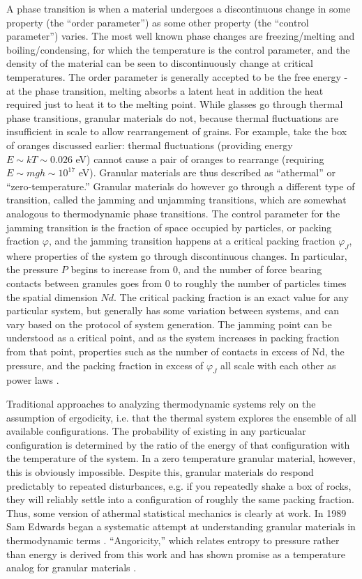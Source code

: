 A phase transition is when a material undergoes a discontinuous change in some property (the ``order parameter'') as some other property (the ``control parameter'') varies. The most well known phase changes are freezing/melting and boiling/condensing, for which the temperature is the control parameter, and the density of the material can be seen to discontinuously change at critical temperatures. The order parameter is generally accepted to be the free energy - at the phase transition, melting absorbs a latent heat in addition the heat required just to heat it to the melting point. While glasses go through thermal phase transitions, granular materials do not, because thermal fluctuations are insufficient in scale to allow rearrangement of grains. For example, take the box of oranges discussed earlier: thermal fluctuations (providing energy $E \sim kT \sim 0.026$ eV) cannot cause a pair of oranges to rearrange (requiring $E \sim mgh \sim 10^{17}$ eV). Granular materials are thus described as ``athermal'' or ``zero-temperature.''  Granular materials do however go through a different type of transition, called the jamming and unjamming transitions, which are somewhat analogous to thermodynamic phase transitions. The control parameter for the jamming transition is the fraction of space occupied by particles, or packing fraction $\varphi$, and the jamming transition happens at a critical packing fraction $\varphi_J$, where properties of the system go through discontinuous changes. In particular, the pressure $P$ begins to increase from 0, and the number of force bearing contacts between granules goes from 0 to roughly the number of particles times the spatial dimension $Nd$. The critical packing fraction is an exact value for any particular system, but generally has some variation between systems, and can vary based on the protocol of system generation. The jamming point can be understood as a critical point, and as the system increases in packing fraction from that point, properties such as the number of contacts in excess of Nd, the pressure, and the packing fraction in excess of $\varphi_J$ all scale with each other as power laws \cite{ohern_jamming_2003,goodrich_scaling_2016}.

Traditional approaches to analyzing thermodynamic systems rely on the assumption of ergodicity, i.e. that the thermal system explores the ensemble of all available configurations. The probability of existing in any particualar configuration is determined by the ratio of the energy of that configuration with the temperature of the system. In a zero temperature granular material, however, this is obviously impossible. Despite this, granular materials do respond predictably to repeated disturbances, e.g. if you repeatedly shake a box of rocks, they will reliably settle into a configuration of roughly the same packing fraction. Thus, some version of athermal statistical mechanics is clearly at work. In 1989 Sam Edwards began a systematic attempt at understanding granular materials in thermodynamic terms \cite{edwards_theory_1989}. ``Angoricity,'' which relates entropy to pressure rather than energy is derived from this work and has shown promise as a temperature analog for granular materials \cite{edwards_distribution_2008,bi_statistical_2015}. 

